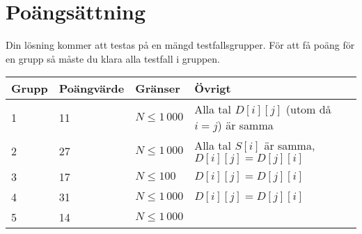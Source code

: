 \section*{Poängsättning}
Din lösning kommer att testas på en mängd testfallsgrupper. För att få poäng för en grupp
så måste du klara alla testfall i gruppen.
\begin{tabular}{| l | l | l | l |}
\hline
Grupp & Poängvärde & Gränser & Övrigt \\ \hline
	1     & 11         & $N \le 1\,000$ & Alla tal $D[i][j]$ (utom då $i = j$) är samma \\ \hline
	2     & 27         & $N \le 1\,000$ & Alla tal $S[i]$ är samma, $D[i][j] = D[j][i]$\\ \hline
	3     & 17         & $N \le 100$ & $D[i][j] = D[j][i]$ \\ \hline
	4     & 31         & $N \le 1\,000$ & $D[i][j] = D[j][i]$ \\ \hline
	5     & 14         & $N \le 1\,000$ & \\ \hline
\end{tabular}
